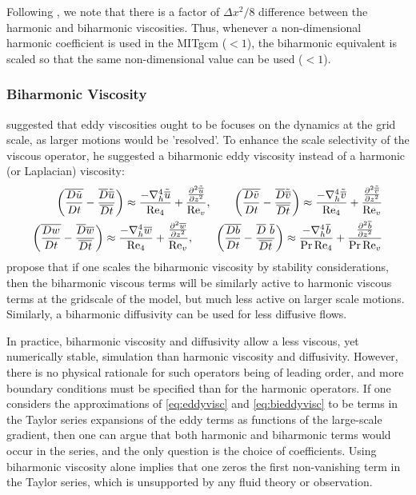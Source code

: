 Following \citet{grha00}, we note that there is a factor of $\Delta
x^2/8$ difference between the harmonic and biharmonic viscosities.
Thus, whenever a non-dimensional harmonic coefficient is used in the
MITgcm ($<1$), the biharmonic equivalent is
scaled so that the same non-dimensional value can be used ($<1$).

\subsubsection{Biharmonic Viscosity}
\citet{ho78} suggested that eddy viscosities ought to be focuses on
the dynamics at the grid scale, as larger motions would be 'resolved'.
To enhance the scale selectivity of the viscous operator, he suggested
a biharmonic eddy viscosity instead of a harmonic (or Laplacian)
viscosity:
\begin{eqnarray}
\left({\av{\Dt \tu}}-{\aDt \atu}\right)\approx\frac{-\nabla^4_h{\atu}}{\Re_4}+\frac{\pds{z}{\atu}}{\Re_v}\label{eq:bieddyvisc},\qquad
\left({\av{\Dt \tv}}-{\aDt \atv}\right)\approx\frac{-\nabla^4_h{\atv}}{\Re_4}+\frac{\pds{z}{\atv}}{\Re_v}\nonumber\\
\left(\av{\Dt w}-\aDt {\av{w}}\right)\approx\frac{-\nabla^4_h\av w}{\Re_4}+\frac{\pds{z}{\av w}}{\Re_v}\nonumber,\qquad
\left(\av{\Dt{b}}-\aDt{\ \av b} \right)\approx\frac{-\nabla^4_h \av b}{\Pr\Re_4}+\frac{\pds{z} {\av b}}{\Pr\Re_v}\nonumber
\end{eqnarray}
\citet{grha00} propose that if one scales the biharmonic viscosity by
stability considerations, then the biharmonic viscous terms will be
similarly active to harmonic viscous terms at the gridscale of the
model, but much less active on larger scale motions.  Similarly, a
biharmonic diffusivity can be used for less diffusive flows.

In practice, biharmonic viscosity and diffusivity allow a less
viscous, yet numerically stable, simulation than harmonic viscosity
and diffusivity.  However, there is no physical rationale for such
operators being of leading order, and more boundary conditions must be
specified than for the harmonic operators. If one considers the
approximations of \ref{eq:eddyvisc} and \ref{eq:bieddyvisc} to be
terms in the Taylor series expansions of the eddy terms as functions
of the large-scale gradient, then one can argue that both harmonic and
biharmonic terms would occur in the series, and the only question is
the choice of coefficients.  Using biharmonic viscosity alone implies
that one zeros the first non-vanishing term in the Taylor series,
which is unsupported by any fluid theory or observation.

